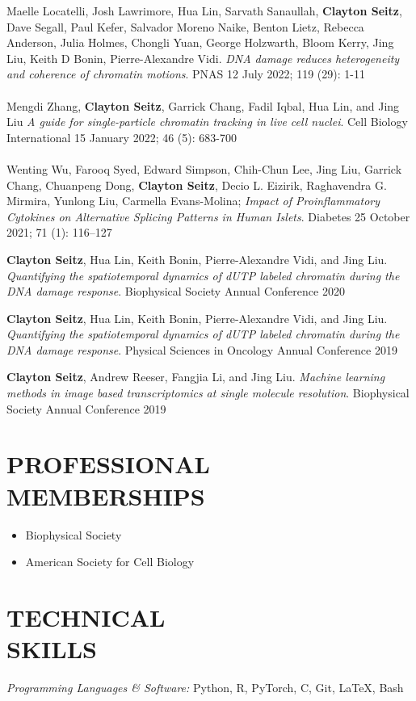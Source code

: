 \documentclass[margin, 10pt]{res} %
\begin{document}
\begin{resume}
Maelle Locatelli\textsuperscript{\textdagger}, Josh Lawrimore\textsuperscript{\textdagger}, Hua Lin\textsuperscript{\textdagger}, Sarvath Sanaullah, \textbf{Clayton Seitz}, Dave Segall, Paul Kefer, Salvador Moreno Naike, Benton Lietz, Rebecca Anderson, Julia Holmes, Chongli Yuan, George Holzwarth, Bloom Kerry, Jing Liu, Keith D Bonin, Pierre-Alexandre Vidi. \textit{DNA damage reduces heterogeneity and coherence of chromatin motions}. PNAS 12 July 2022; 119 (29): 1-11
\\
\\
Mengdi Zhang, \textbf{Clayton Seitz}, Garrick Chang, Fadil Iqbal, Hua Lin, and Jing Liu \textit{A guide for single-particle chromatin tracking in live cell nuclei}. Cell Biology International 15 January 2022; 46 (5): 683-700
\\
\\
Wenting Wu, Farooq Syed, Edward Simpson, Chih-Chun Lee, Jing Liu, Garrick Chang, Chuanpeng Dong, \textbf{Clayton Seitz}, Decio L. Eizirik, Raghavendra G. Mirmira, Yunlong Liu, Carmella Evans-Molina; \textit{Impact of Proinflammatory Cytokines on Alternative Splicing Patterns in Human Islets}. Diabetes 25 October 2021; 71 (1): 116–127

\textbf{Clayton Seitz}, Hua Lin, Keith Bonin, Pierre-Alexandre Vidi, and Jing Liu. \textit{Quantifying the spatiotemporal dynamics of dUTP labeled chromatin during the DNA damage response}. Biophysical Society Annual Conference 2020

\textbf{Clayton Seitz}, Hua Lin, Keith Bonin, Pierre-Alexandre Vidi, and Jing Liu. \textit{Quantifying the spatiotemporal dynamics of dUTP labeled chromatin during the DNA damage response}. Physical Sciences in Oncology Annual Conference 2019

\textbf{Clayton Seitz}, Andrew Reeser, Fangjia Li, and Jing Liu. \textit{Machine learning methods in image based transcriptomics at single molecule resolution}. Biophysical Society Annual Conference 2019


\section{PROFESSIONAL MEMBERSHIPS}

\begin{itemize}
\item Biophysical Society
\item American Society for Cell Biology
\end{itemize}

\section{TECHNICAL \\ SKILLS} 

{\sl Programming Languages \& Software:} 
Python, R, PyTorch, C, Git, LaTeX, Bash\\

\end{resume}
\end{document}
